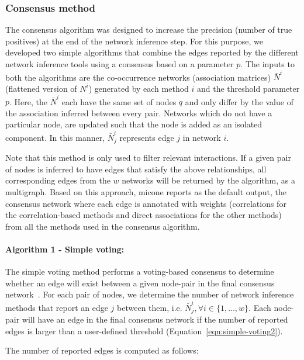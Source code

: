   \subsubsection*{Consensus method}
  \vspace{-5mm}
  The consensus algorithm was designed to increase the precision (number of true positives) at the end of the network inference step.
  For this purpose, we developed two simple algorithms that combine the edges reported by the different network inference tools using a consensus based on a parameter $p$.
  The inputs to both the algorithms are the co-occurrence networks (association matrices) $\bar{N}^i$ (flattened version of $N^{i}$) generated by each method $i$ and the threshold parameter $p$.
  Here, the $\bar{N}^{i}$ each have the same set of nodes $q$ and only differ by the value of the association inferred between every pair.
  Networks which do not have a particular node, are updated such that the node is added as an isolated component.
  In this manner, $\bar{N}^{i}_j$ represents edge $j$ in network $i$.

    Note that this method is only used to filter relevant interactions.
    If a given pair of nodes is inferred to have edges that satisfy the above relationships, all corresponding edges from the $w$ networks will be returned by the algorithm, as a multigraph.
    Based on this approach, \ac{micone} reports as the default output, the consensus network where each edge is annotated with weights (correlations for the correlation-based methods and direct associations for the other methods) from all the methods used in the consensus algorithm.

  \paragraph*{Algorithm 1 - Simple voting:}
  The simple voting method performs a voting-based consensus to determine whether an edge will exist between a given node-pair in the final consensus network~\cite{bustinceFuzzySetsTheir2008,tsarevApplicationMajorityVoting2018}.
  For each pair of nodes, we determine the number of network inference methods that report an edge $j$ between them, i.e. $\bar{N}^{i}_{j}, \forall i \in \{1,\dots,w\}$.
  Each node-pair will have an edge in the final consensus network if the number of reported edges is larger than a user-defined threshold (Equation~\ref{eqn:simple-voting2}).

 The number of reported edges is computed as follows:

